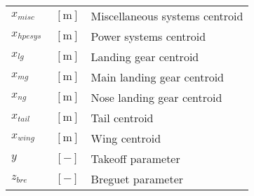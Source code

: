 {\begin{supertabular}{lcl}
$x_{misc}$ & $~\mathrm{[m]}$ & Miscellaneous systems centroid\\
$x_{hpesys}$ & $~\mathrm{[m]}$ & Power systems centroid\\
$x_{lg}$ & $~\mathrm{[m]}$ & Landing gear centroid\\
$x_{mg}$ & $~\mathrm{[m]}$ & Main landing gear centroid\\
$x_{ng}$ & $~\mathrm{[m]}$ & Nose landing gear centroid\\
$x_{tail}$ & $~\mathrm{[m]}$ & Tail centroid\\
$x_{wing}$ & $~\mathrm{[m]}$ & Wing centroid\\
$y$ & $~[-]$ & Takeoff parameter \\
$z_{bre}$ & $~[-]$ & Breguet parameter \\
\bottomrule
\end{supertabular}}

% 
